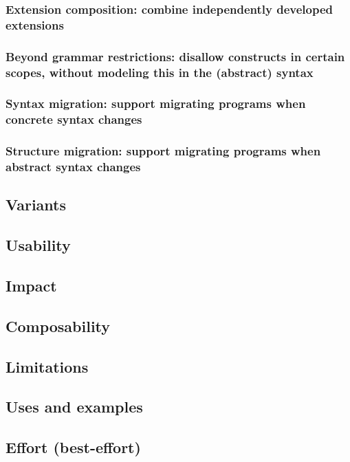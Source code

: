 \documentclass[preprint,numbers,10pt]{sigplanconf}
\begin{document}
\subsubsection{Extension composition: combine independently developed extensions}
\subsubsection{Beyond grammar restrictions: disallow constructs in certain scopes, without modeling this in the (abstract) syntax}
\subsubsection{Syntax migration: support migrating programs when concrete syntax changes}
\subsubsection{Structure migration: support migrating programs when abstract syntax changes}

\subsection{Variants}

\subsection{Usability}

\subsection{Impact}

\subsection{Composability}

\subsection{Limitations}

\subsection{Uses and examples}

\subsection{Effort (best-effort)}
\end{document}
